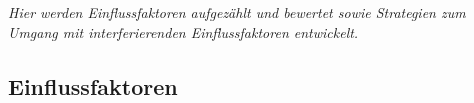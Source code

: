 \documentclass[enabledeprecatedfontcommands,fontsize=12pt,paper=a4,twoside]{scrartcl}
\begin{document}
\label{sec:globale_analyse}

{\it Hier werden Einflussfaktoren aufgezählt und bewertet sowie Strategien
zum Umgang mit interferierenden Einflussfaktoren entwickelt.}

\subsection{Einflussfaktoren}




\end{document}
